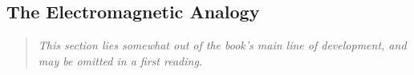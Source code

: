 
\subsection{The Electromagnetic Analogy\optionalreading}\label{sec:4.10}

\begin{quote}
\small\itshape
This section lies somewhat out of the book's main line of development, and
may be omitted in a first reading.
\end{quote}

